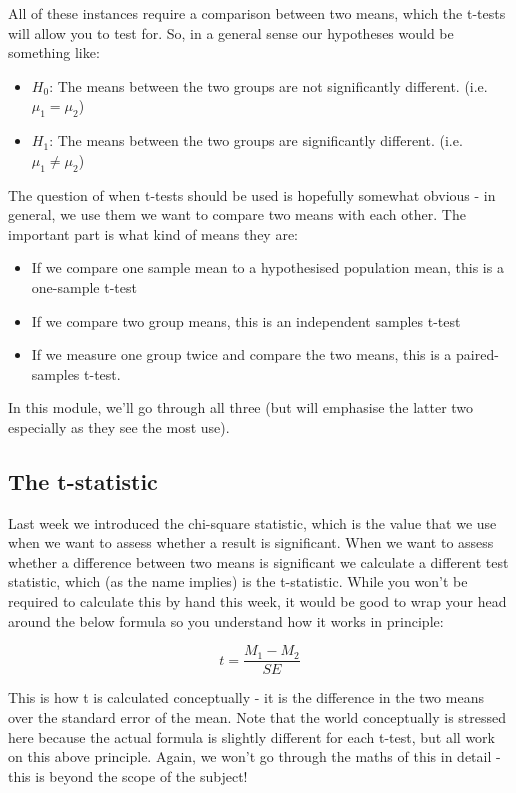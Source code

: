 \documentclass[
]{book}
\providecommand{\tightlist}{%
  \setlength{\itemsep}{0pt}\setlength{\parskip}{0pt}}
\begin{document}
All of these instances require a comparison between two means, which the t-tests will allow you to test for. So, in a general sense our hypotheses would be something like:

\begin{itemize}
\tightlist
\item
  \(H_0\): The means between the two groups are not significantly different. (i.e.~\(\mu_1 = \mu_2\))
\item
  \(H_1\): The means between the two groups are significantly different. (i.e.~\(\mu_1 \neq \mu_2\))
\end{itemize}

The question of when t-tests should be used is hopefully somewhat obvious - in general, we use them we want to compare two means with each other. The important part is what kind of means they are:

\begin{itemize}
\tightlist
\item
  If we compare one sample mean to a hypothesised population mean, this is a one-sample t-test
\item
  If we compare two group means, this is an independent samples t-test
\item
  If we measure one group twice and compare the two means, this is a paired-samples t-test.
\end{itemize}

In this module, we'll go through all three (but will emphasise the latter two especially as they see the most use).

\hypertarget{the-t-statistic}{%
\subsection{The t-statistic}\label{the-t-statistic}}

Last week we introduced the chi-square statistic, which is the value that we use when we want to assess whether a result is significant. When we want to assess whether a difference between two means is significant we calculate a different test statistic, which (as the name implies) is the t-statistic. While you won't be required to calculate this by hand this week, it would be good to wrap your head around the below formula so you understand how it works in principle:

\[
t = \frac{M_1 - M_2}{SE}
\]

This is how t is calculated conceptually - it is the difference in the two means over the standard error of the mean. Note that the world conceptually is stressed here because the actual formula is slightly different for each t-test, but all work on this above principle. Again, we won't go through the maths of this in detail - this is beyond the scope of the subject!
\end{document}
